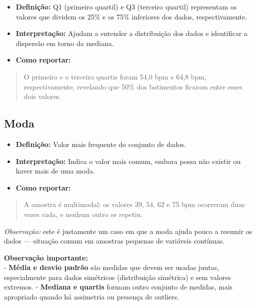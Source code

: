 \documentclass[
]{book}
\providecommand{\tightlist}{%
  \setlength{\itemsep}{0pt}\setlength{\parskip}{0pt}}
\begin{document}
\begin{itemize}
\tightlist
\item
  \textbf{Definição:} Q1 (primeiro quartil) e Q3 (terceiro quartil) representam os valores que dividem os 25\% e os 75\% inferiores dos dados, respectivamente.\\
\item
  \textbf{Interpretação:} Ajudam a entender a distribuição dos dados e identificar a dispersão em torno da mediana.\\
\item
  \textbf{Como reportar:}
\end{itemize}

\begin{quote}
O primeiro e o terceiro quartis foram 54,0 bpm e 64,8 bpm, respectivamente, revelando que 50\% dos batimentos ficaram entre esses dois valores.
\end{quote}

\subsection{Moda}\label{moda}

\begin{itemize}
\tightlist
\item
  \textbf{Definição:} Valor mais frequente do conjunto de dados.\\
\item
  \textbf{Interpretação:} Indica o valor mais comum, embora possa não existir ou haver mais de uma moda.\\
\item
  \textbf{Como reportar:}
\end{itemize}

\begin{quote}
A amostra é multimodal: os valores 39, 54, 62 e 75 bpm ocorreram duas vezes cada, e nenhum outro se repetiu.
\end{quote}

\emph{Observação:} este é justamente um caso em que a moda ajuda pouco a resumir os dados --- situação comum em amostras pequenas de variáveis contínuas.

\textbf{Observação importante:}\\
- \textbf{Média e desvio padrão} são medidas que devem ser usadas juntas, especialmente para dados simétricos (distribuição simétrica) e sem valores extremos.
- \textbf{Mediana e quartis} formam outro conjunto de medidas, mais apropriado quando há assimetria ou presença de outliers.
\end{document}
